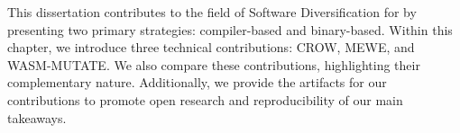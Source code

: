 This dissertation contributes to the field of Software Diversification for \Wasm by presenting two primary strategies: compiler-based and binary-based. 
Within this chapter, we introduce three technical contributions: CROW, MEWE, and WASM-MUTATE.
We also compare these contributions, highlighting their complementary nature.
Additionally, we provide the artifacts for our contributions to promote open research and reproducibility of our main takeaways.

